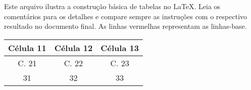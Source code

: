 \documentclass[a4paper,12pt]{article}
\begin{document}
	Este arquivo ilustra a construção básica de tabelas no \LaTeX. Leia os comentários para os detalhes e compare sempre as instruções com o respectivo resultado no documento final. As linhas vermelhas representam as linhas-base.
	
	
	\linhabase\hfill
	\begin{tabular}[c]{ccc}
		\hline
		Célula 11 & Célula 12 & Célula 13 \\
		\hline
		C. 21     & C. 22     & C. 23     \\
		\hline
		31        & 32        & 33        \\
		\hline
	\end{tabular}%
	\hfill\null
	
	
\end{document}
